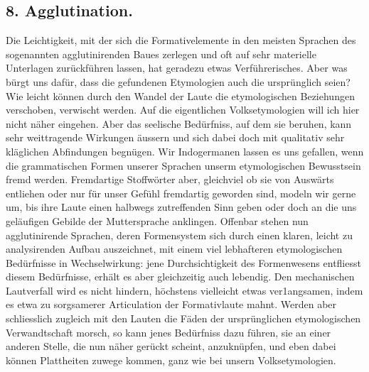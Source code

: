 \clearpage{}
\subsection*{8. Agglutination.}\label{IV.IV.8}

Die Leichtigkeit, mit der sich die Formativelemente in den meisten Sprachen des sogenannten agglutinirenden Baues zerlegen und oft auf sehr materielle Unterlagen zurückführen lassen, hat geradezu etwas Verführerisches. Aber was bürgt uns dafür, dass die gefundenen Etymologien auch die ursprünglich  seien? Wie leicht können durch den Wandel der Laute die etymologischen Beziehungen verschoben, verwischt werden. Auf die eigentlichen Volksetymologien will ich hier nicht näher eingehen. Aber das seelische Bedürfniss, auf dem sie beruhen, kann sehr weittragende Wirkungen äussern und sich dabei doch mit qualitativ sehr kläglichen Abfindungen begnügen. Wir Indogermanen lassen es uns gefallen, wenn die grammatischen Formen unserer Sprachen unserm etymologischen Bewusstsein fremd werden. Fremdartige Stoff\label{fp.384}wörter aber, gleichviel ob sie von Auswärts entliehen oder nur für unser Gefühl fremdartig geworden sind, modeln wir gerne um, bis ihre Laute einen halbwegs zutreffenden Sinn geben oder doch an die uns geläufigen Gebilde der Muttersprache anklingen. Offenbar stehen nun agglutinirende Sprachen, deren Formensystem sich durch einen klaren, leicht zu analysirenden Aufbau auszeichnet, mit einem viel lebhafteren etymologischen Bedürfnisse in Wechselwirkung: jene Durchsichtigkeit des Formenwesens entfliesst diesem Bedürfnisse, erhält es aber gleichzeitig auch lebendig. Den mechanischen Lautverfall wird es nicht hindern, höchstens vielleicht etwas ver1angsamen, indem es etwa zu sorgsamerer Articulation der Formativlaute mahnt. Werden aber schliesslich zugleich mit den Lauten die Fäden der ursprünglichen etymologischen Verwandtschaft morsch, so kann jenes Bedürfniss dazu führen, sie an einer anderen Stelle, die nun näher gerückt scheint, anzuknüpfen, und eben dabei können Plattheiten zuwege kommen, ganz wie bei unsern Volksetymologien.


